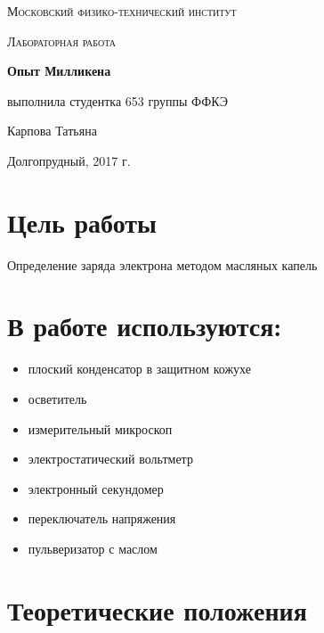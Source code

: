 \documentclass[a4paper]{article}
\begin{document}
\begin{titlepage}
	\centering
	\vspace{5cm}
	{\scshape\LARGE Московский физико-технический институт \par}
	\vspace{4cm}
	{\scshape\Large Лабораторная работа \par}
	\vspace{1cm}
	{\huge\bfseries Опыт Милликена \par}
	\vspace{1cm}
	\vfill
\begin{flushright}
	{\large выполнила студентка 653 группы ФФКЭ}\par
	\vspace{0.3cm}
	{\LARGE Карпова Татьяна}
\end{flushright}
	

	\vfill

	Долгопрудный, 2017 г.
\end{titlepage}

\section{Цель работы}
Определение заряда электрона методом масляных капель

\section{В работе используются:}
\begin{itemize}
    \item плоский конденсатор в защитном кожухе
    \item осветитель
    \item измерительный микроскоп
    \item электростатический вольтметр
    \item электронный секундомер
    \item переключатель напряжения
    \item пульверизатор с маслом
\end{itemize}

\section{Теоретические положения}
\end{document}
